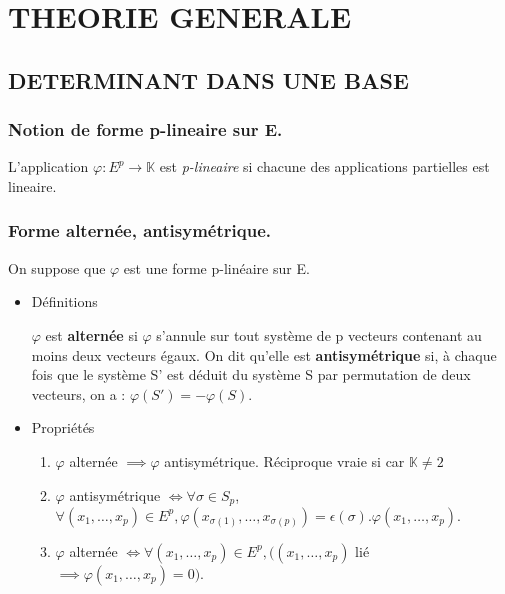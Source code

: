 \documentclass[a4paper,12pt]{article}
\title{\letitle}
\author{\leauthor}
\date{}
\begin{document}
\maketitle

    \section{THEORIE GENERALE}

\subsection{DETERMINANT DANS UNE BASE}

\subsubsection{Notion de forme p-lineaire sur E.}

L'application $\varphi:E^p \rightarrow \mathbb{K}$
 est {\it p-lineaire} si chacune des applications partielles
 est lineaire.

\subsubsection{Forme alternée, antisymétrique.}

On suppose que $\varphi$ est une forme p-linéaire sur E.

\begin{itemize}
\item Définitions

$\varphi$ est \textbf{ alternée } si $\varphi$ s’annule sur tout système de p vecteurs contenant au moins
deux vecteurs égaux. On dit qu’elle est \textbf{ antisymétrique } si, à chaque fois que le système S'
est déduit du système S par permutation de deux vecteurs, on a : $\varphi(S')=-\varphi(S)$.

\item Propriétés

\begin{enumerate}
\item $\varphi$ alternée $\implies \varphi$ antisymétrique. Réciproque vraie si car $\mathbb{K}\neq 2$

\item $\varphi$ antisymétrique $\iff \forall \sigma \in S_p$, $\forall (x_1,\hdots,x_p) 
\in E^p, \varphi(x_{\sigma(1)},\hdots,x_{\sigma(p)})=\epsilon (\sigma).\varphi(x_1,\hdots,x_p)$.

\item $\varphi$ alternée $\iff \forall (x_1,\hdots,x_p)\in E^p, ((x_1,\hdots,x_p)$ 
lié $\implies \varphi (x_1,\hdots,x_p) = 0)$.
\end{enumerate}
\end{itemize}
\end{document}
